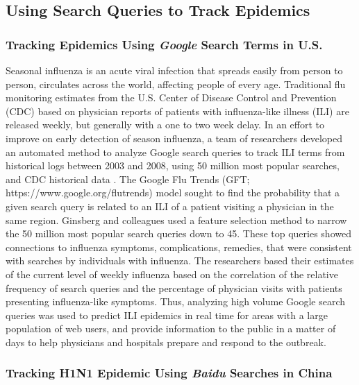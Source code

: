 \documentclass[sigconf]{acmart}
\begin{document}
\subsection{Using Search Queries to Track Epidemics}

\subsubsection{Tracking Epidemics Using {\itshape Google} Search Terms in U.S.}

Seasonal influenza is an acute viral infection that spreads easily from person to 
person, circulates across the world, affecting people of every age. Traditional 
flu monitoring estimates from the U.S. Center of Disease Control and Prevention 
(CDC) based on physician reports of patients with influenza-like illness (ILI) are 
released weekly, but generally with a one to two week delay. In an effort to improve 
on early detection of season influenza, a team of researchers developed an automated 
method to analyze Google search queries to track ILI terms from historical logs 
between 2003 and 2008, using 50 million most popular searches, and CDC historical 
data \cite{ginsburg09}. The Google Flu Trends (GFT; https://www.google.org/flutrends)
model sought to find the probability that a given search query is related to an ILI 
of a patient visiting a physician in the same region. Ginsberg and colleagues used 
a feature selection method to narrow  the 50 million most popular search queries down
to 45. These top queries showed connections to influenza symptoms, complications, 
remedies, that were consistent with searches by individuals with influenza. The 
researchers based their estimates of the current level of weekly influenza based on 
the correlation of the relative frequency of search queries and the percentage of 
physician visits with patients presenting influenza-like symptoms. Thus, analyzing 
high volume Google search queries was used to predict ILI epidemics in real time for 
areas with a large population of web users, and provide information to the public in 
a matter of days to help physicians and hospitals prepare and respond to the 
outbreak. 

\subsubsection{Tracking H1N1 Epidemic Using {\itshape Baidu} Searches in China}
\end{document}
